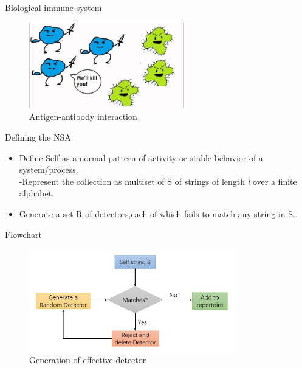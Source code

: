 \begin{frame}{Biological immune system}
  \begin{figure}[hb]
  \centering
  \includegraphics[width=0.6\textwidth]{img/ag_ab.jpg}
  \caption{Antigen-antibody interaction}
  \end{figure}
\end{frame}

\begin{frame}{Defining the NSA}
  \begin{itemize}
  \item<1->{
    Define Self as a normal pattern of activity or stable behavior of a system/process.\\
    -Represent the collection as multiset of S of strings of length \emph{l} over a finite alphabet.
  }
  \item<2-> {   
    Generate a set R of detectors,each of which fails to match any string in S.
  }
  \end{itemize}
\end{frame}
 
\begin{frame}{Flowchart}
  \begin{figure}[hb]
  \centering
  \includegraphics[width=0.8\textwidth]{img/NSAflowchart1.jpg}
  \caption{Generation of effective detector}
  \end{figure}
\end{frame}

